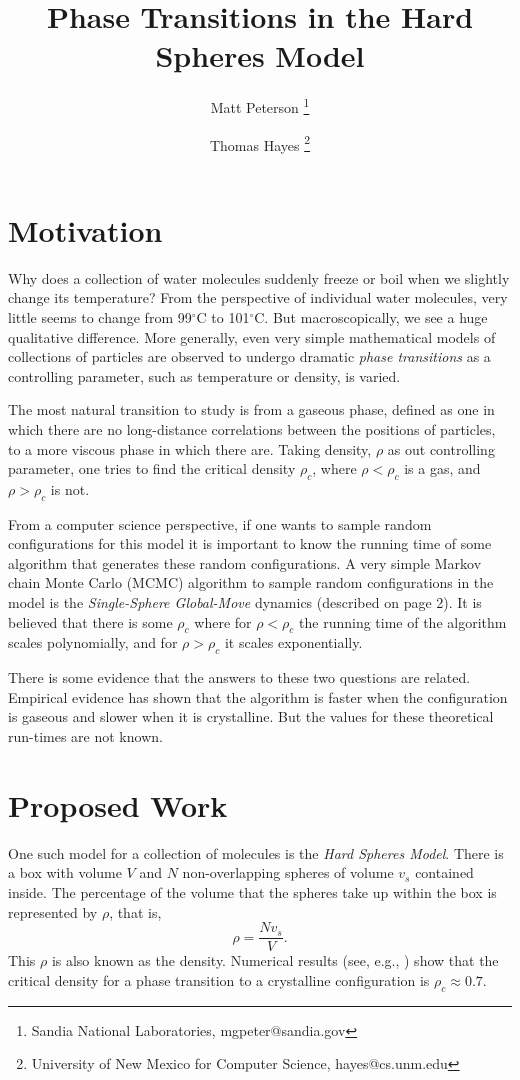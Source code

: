 \documentclass[a4paper,11pt]{article}
\title{Phase Transitions in the Hard Spheres Model}
\author{Matt Peterson \thanks{Sandia National Laboratories, mgpeter@sandia.gov} \and Thomas Hayes \thanks{University of New Mexico for Computer Science, hayes@cs.unm.edu}}
\begin{document}
\maketitle

\section*{Motivation}

Why does a collection of water molecules suddenly freeze or boil when we slightly change its temperature?  From the perspective of individual water molecules, very little seems to change from 99$^\circ$C to 101$^\circ$C.  But macroscopically, we see a huge qualitative difference.  More generally, even very simple mathematical models of collections of particles are observed to undergo dramatic \textit{phase transitions} as a controlling parameter, such as temperature or density, is varied.

The most natural transition to study is from a gaseous phase, defined as one in which there are no long-distance correlations between the positions of particles, to a more viscous phase in which there are.  Taking density, $\rho$ as out controlling parameter, one tries to find the critical density $\rho_c$, where $\rho < \rho_c$ is a gas, and $\rho > \rho_c$ is not.

From a computer science perspective, if one wants to sample random configurations for this model it is important to know the running time of some algorithm that generates these random configurations.  A very simple Markov chain Monte Carlo (MCMC) algorithm to sample random configurations in the model is the \textit{Single-Sphere Global-Move} dynamics (described on page 2).  It is believed that there is some $\rho_c$ where for $\rho < \rho_c$ the running time of the algorithm scales polynomially, and for $\rho > \rho_c$ it scales exponentially.

There is some evidence that the answers to these two questions are related.  Empirical evidence has shown that the algorithm is faster when the configuration is gaseous and slower when it is crystalline.  But the values for these theoretical run-times are not known.

\section*{Proposed Work}

One such model for a collection of molecules is the \textit{Hard Spheres Model}.  There is a box with volume $V$ and $N$ non-overlapping spheres of volume $v_s$ contained inside.  The percentage of the volume that the spheres take up within the box is represented by $\rho$, that is,
\begin{displaymath}
  \rho = \frac{Nv_s}{V}.
\end{displaymath}
This $\rho$ is also known as the density. Numerical results (see, e.g., \cite{Mak}\cite{Piasecki}) show that the critical density for a phase transition to a crystalline configuration is $\rho_c \approx 0.7$.
\end{document}
